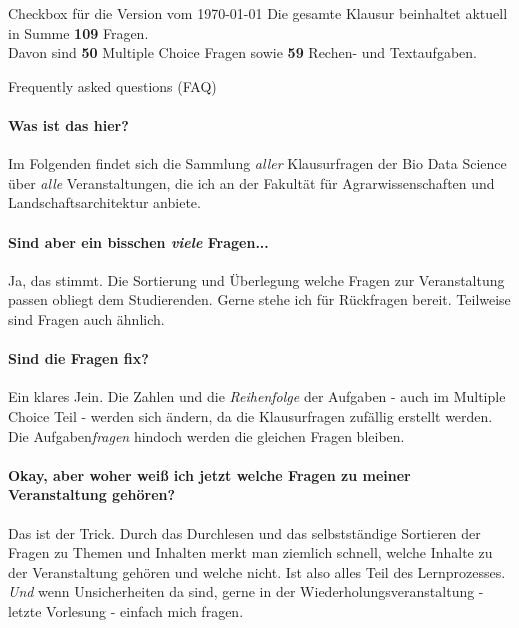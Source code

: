 \documentclass[a4paper, 10pt]{scrartcl}\usepackage[]{graphicx}\usepackage[]{xcolor}
\begin{document}
\begin{graybox}{Checkbox für die Version vom \today}
  \Large Die gesamte Klausur beinhaltet aktuell in Summe
  \textbf{109}
  Fragen.\\[1Ex]
  Davon sind \textbf{50} Multiple
  Choice Fragen sowie \textbf{59} Rechen- und
  Textaufgaben.
\end{graybox}

\vfill

\begin{takehomebox}{Frequently asked questions (FAQ)}
  \paragraph{Was ist das hier?} Im Folgenden findet sich die Sammlung
  \textit{aller} Klausurfragen der Bio Data Science über \textit{alle}
  Veranstaltungen, die ich an der Fakultät für Agrarwissenschaften und
  Landschaftsarchitektur anbiete.
  \vspace{1Ex}
  \paragraph{Sind aber ein bisschen \textit{viele} Fragen...} Ja, das
  stimmt. Die Sortierung und Überlegung welche Fragen zur Veranstaltung
  passen obliegt dem Studierenden. Gerne stehe ich für Rückfragen
  bereit. Teilweise sind Fragen auch ähnlich.
  \vspace{1Ex}
  \paragraph{Sind die Fragen fix?} Ein klares Jein. Die Zahlen und die
  \textit{Reihenfolge} der Aufgaben - auch im Multiple Choice Teil - werden
  sich ändern, da die Klausurfragen zufällig erstellt werden. Die
  Aufgaben\textit{fragen} hindoch werden die gleichen Fragen bleiben.
  \vspace{1Ex}
  \paragraph{Okay, aber woher weiß ich jetzt welche Fragen zu meiner
    Veranstaltung gehören?} Das ist der Trick. Durch das Durchlesen und das
  selbstständige Sortieren der Fragen zu Themen und Inhalten merkt man
  ziemlich schnell, welche Inhalte zu der Veranstaltung gehören und welche
  nicht. Ist also alles Teil des Lernprozesses. \textit{Und} wenn
  Unsicherheiten da sind, gerne in der Wiederholungsveranstaltung - letzte
  Vorlesung - einfach mich fragen.
  \vspace{1Ex}

\end{takehomebox}
\end{document}
